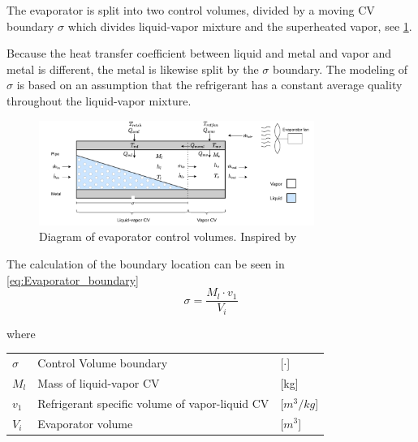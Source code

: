 The evaporator is split into two control volumes, divided by a moving CV boundary $\sigma$ which divides liquid-vapor mixture and the superheated vapor, see \cref{fig:evapo_CV}.

Because the heat transfer coefficient between liquid and metal and vapor and metal is different, the metal is likewise split by the $\sigma$ boundary. The modeling of $\sigma$ is based on an assumption that the refrigerant has a constant average quality throughout the liquid-vapor mixture.

\begin{figure}[h!]
	\centering
	\includegraphics[width=0.8\textwidth]{Graphics/Evaporator_CV_diagram.pdf}
	\caption{Diagram of evaporator control volumes. Inspired by  \cite{Sorensen2013} \cite{Borlum2016}}
	\label{fig:evapo_CV}
\end{figure}






The calculation of the boundary location can be seen in \cref{eq:Evaporator_boundary}
\begin{equation} \label{eq:Evaporator_boundary}
	\sigma = \frac{M_l \cdot v_1}{V_i} 
\end{equation}

where

\begin{center}
	\begin{tabular}{l p{8cm} l}
		$\sigma$				& Control Volume boundary 			& [$\cdot$] \\		
		$M_l$				& Mass of liquid-vapor CV 			& [\si{kg}] \\		
		$v_1$				& Refrigerant specific volume of vapor-liquid CV	& [$\si{m}^3/\si{kg}$] \\		
		$V_i$				& Evaporator volume 			& [$\si{m}^3$]
	\end{tabular}
\end{center}


